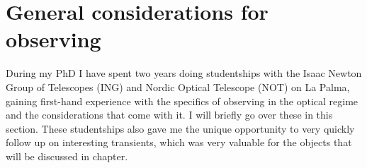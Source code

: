\documentclass[a4paper,oneside,12pt, class=Latex/Classes/PhDthesisPSnPDF, crop=false]{standalone}
\begin{document}



\section{General considerations for observing}
\label{considerations}
During my PhD I have spent two years doing studentships with the Isaac Newton Group of Telescopes (ING) and Nordic Optical Telescope (NOT) on La Palma, gaining first-hand experience with the specifics of observing in the optical regime and the considerations that come with it. I will briefly go over these in this section. These studentships also gave me the unique opportunity to very quickly follow up on interesting transients, which was very valuable for the objects that will be discussed in \color{red}chapter\color{black}.

\end{document}
